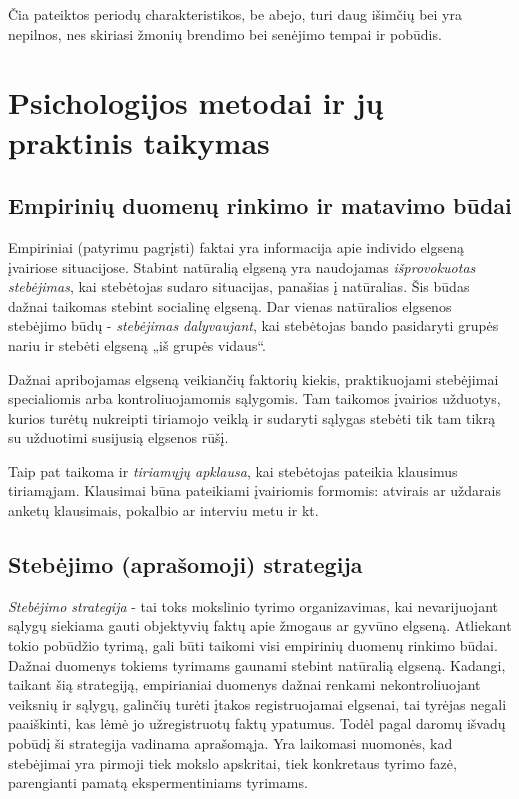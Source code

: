 Čia pateiktos periodų charakteristikos, be abejo, turi daug išimčių bei yra 
nepilnos, nes skiriasi žmonių brendimo bei senėjimo tempai ir pobūdis.

\section{Psichologijos metodai ir jų praktinis taikymas}

\label{tema:psichologijos_metodai}

\subsection{Empirinių duomenų rinkimo ir matavimo būdai}

Empiriniai (patyrimu pagrįsti) faktai yra informacija apie individo elgseną
įvairiose situacijose. Stabint natūralią elgseną yra naudojamas 
\emph{išprovokuotas stebėjimas}, kai stebėtojas sudaro situacijas, panašias 
į natūralias. Šis būdas dažnai taikomas stebint socialinę elgseną. Dar 
vienas natūralios elgsenos stebėjimo būdų - \emph{stebėjimas dalyvaujant}, 
kai stebėtojas bando pasidaryti grupės nariu ir stebėti elgseną „iš grupės 
vidaus“.

Dažnai apribojamas elgseną veikiančių faktorių kiekis, praktikuojami stebėjimai
specialiomis arba kontroliuojamomis sąlygomis. Tam taikomos įvairios užduotys,
kurios turėtų nukreipti tiriamojo veiklą ir sudaryti sąlygas stebėti tik tam
tikrą su užduotimi susijusią elgsenos rūšį.

Taip pat taikoma ir \emph{tiriamųjų apklausa}, kai stebėtojas pateikia klausimus
tiriamąjam. Klausimai būna pateikiami įvairiomis formomis: atvirais ar 
uždarais anketų klausimais, pokalbio ar interviu metu ir kt.

\subsection{Stebėjimo (aprašomoji) strategija}

\emph{Stebėjimo strategija} - tai toks mokslinio tyrimo organizavimas, kai 
nevarijuojant sąlygų siekiama gauti objektyvių faktų apie žmogaus ar gyvūno 
elgseną. Atliekant tokio pobūdžio tyrimą, gali būti taikomi visi empirinių 
duomenų rinkimo būdai. Dažnai duomenys tokiems tyrimams gaunami stebint 
natūralią elgseną. Kadangi, taikant šią strategiją, empirianiai duomenys 
dažnai renkami nekontroliuojant veiksnių ir sąlygų, galinčių turėti įtakos 
registruojamai elgsenai, tai tyrėjas negali paaiškinti, kas lėmė jo 
užregistruotų faktų ypatumus. Todėl pagal daromų išvadų pobūdį ši strategija 
vadinama aprašomąja. Yra laikomasi nuomonės, kad stebėjimai yra pirmoji tiek
mokslo apskritai, tiek konkretaus tyrimo fazė, parengianti pamatą 
ekspermentiniams tyrimams.


